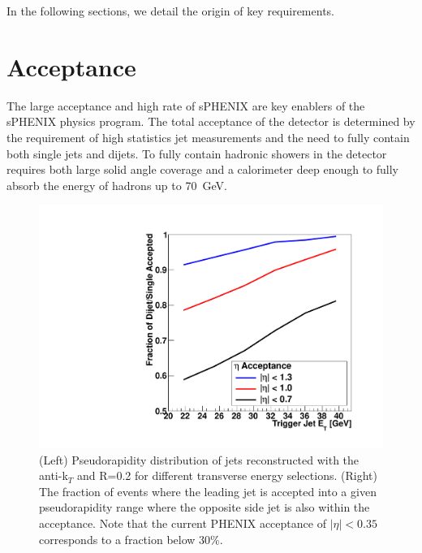 In the following sections, we detail the origin of key requirements.

\section{Acceptance}

The large acceptance and high rate of sPHENIX are key enablers of the sPHENIX 
physics program.
The total
acceptance of the detector is determined by the requirement of high
statistics jet measurements and the need to fully contain both single
jets and dijets.  To fully contain hadronic showers in the detector
requires both large solid angle coverage and a calorimeter deep enough
to fully absorb the energy of hadrons up to 70~GeV.

\begin{figure}[hbt!]
 \begin{center}
  \hfill
  \includegraphics[trim = 2 2 2 2, clip, width=0.45\linewidth]{figs/figure_detectorrequirements_dijetaccept}
  \caption[Pseudorapidity distribution of \pythia jets reconstructed
  with the \fastjet anti-k$_{T}$ and the fraction of events in which
  the leading and subleading jet are in the specified
  acceptance]{\label{fig:pythia_dijet_accept}(Left) Pseudorapidity
    distribution of \pythia jets reconstructed with the \fastjet
    anti-k$_{T}$ and R=0.2 for different transverse energy selections.
    (Right) The fraction of \pythia events where the leading jet is
    accepted into a given pseudorapidity range where the opposite side
    jet is also within the acceptance.  Note that the current PHENIX
    acceptance of $|\eta|<0.35$ corresponds to a fraction below 30\%.}
 \end{center}
\end{figure}

